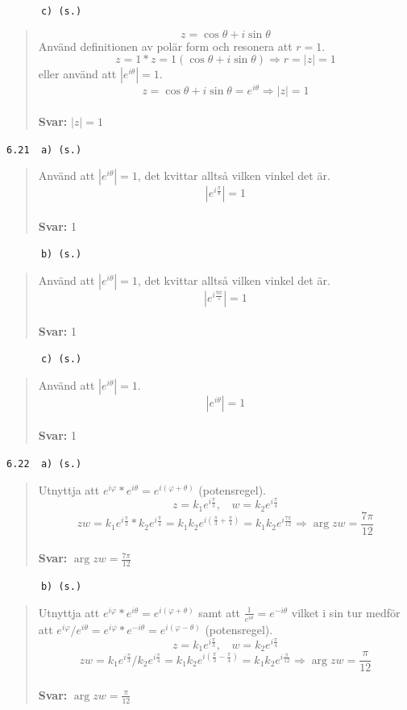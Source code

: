 \documentclass[a4paper]{article}
\newcommand{\tskcol}[1]{\textcolor{tskcol}{#1}}
\begin{document}
	\pagebreak
	\texttt{\tskcol{~~~~~~c) (s.)}}
	\begin{quotation}
		\noindent
		\[z=\cos\theta+i\sin\theta\]
		Använd definitionen av polär form och resonera att $r=1$.
		\[z=
		1*z=
		1(\cos\theta+i\sin\theta)\Rightarrow
		r=|z|=1\]
		eller använd att $\left|e^{i\theta}\right|=1$.
		\[z=
		\cos\theta+i\sin\theta=
		e^{i\theta} \Rightarrow
		|z|=1\]
		\\
		\textbf{Svar:} $|z|=1$
	\end{quotation}
	
	\texttt{\tskcol{6.21~~a) (s.)}}
	\begin{quotation}
		\noindent
		Använd att $\left|e^{i\theta}\right|=1$, det kvittar alltså vilken vinkel det är.
		\[|e^{i\tfrac{\pi}{8}}|=1\]
		\\
		\textbf{Svar:} 1
	\end{quotation}
	
	\texttt{\tskcol{~~~~~~b) (s.)}}
	\begin{quotation}
		\noindent
		Använd att $\left|e^{i\theta}\right|=1$, det kvittar alltså vilken vinkel det är.
		\[|e^{i\tfrac{9\pi}{5}}|=1\]
		\\
		\textbf{Svar:} 1
	\end{quotation}
	
	\texttt{\tskcol{~~~~~~c) (s.)}}
	\begin{quotation}
		\noindent
		Använd att $\left|e^{i\theta}\right|=1$.
		\[|e^{i\theta}|=1\]
		\\
		\textbf{Svar:} 1
	\end{quotation}
	
	\texttt{\tskcol{6.22~~a) (s.)}}
	\begin{quotation}
		\noindent
		Utnyttja att $e^{i\varphi}*e^{i\theta}=e^{i(\varphi+\theta)}$ (potensregel).
		\[z=k_1e^{i\frac{\pi}{3}},~~~~w=k_2e^{i\frac{\pi}{4}}\]
		\[zw=
		k_1e^{i\frac{\pi}{3}}*k_2e^{i\frac{\pi}{4}}=
		k_1k_2e^{i(\frac{\pi}{3}+\frac{\pi}{4})}=
		k_1k_2e^{i\frac{7\pi}{12}} \Rightarrow
		\arg zw=\frac{7\pi}{12}\]
		\\
		\textbf{Svar:} $\arg zw=\frac{7\pi}{12}$
	\end{quotation}
	
	\pagebreak
	\texttt{\tskcol{~~~~~~b) (s.)}}
	\begin{quotation}
		\noindent
		Utnyttja att $e^{i\varphi}*e^{i\theta}=e^{i(\varphi+\theta)}$ samt att $\frac{1}{e^{i\theta}}=e^{-i\theta}$ vilket i sin tur medför att $e^{i\varphi}/e^{i\theta}=e^{i\varphi}*e^{-i\theta}=e^{i(\varphi-\theta)}$ (potensregel).
		\[z=k_1e^{i\frac{\pi}{3}},~~~~w=k_2e^{i\frac{\pi}{4}}\]
		\[zw=
		k_1e^{i\frac{\pi}{3}}/k_2e^{i\frac{\pi}{4}}=
		k_1k_2e^{i(\frac{\pi}{3}-\frac{\pi}{4})}=
		k_1k_2e^{i\frac{\pi}{12}} \Rightarrow
		\arg zw=\frac{\pi}{12}\]
		\\
		\textbf{Svar:} $\arg zw=\frac{\pi}{12}$
	\end{quotation}
	
\end{document}
